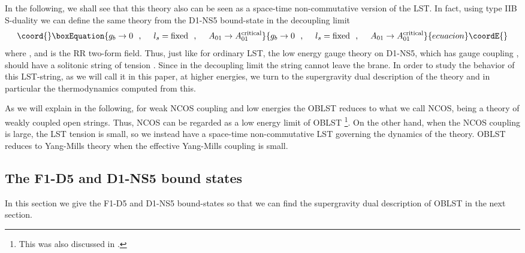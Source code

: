 \documentclass[a4paper,twoside,titlepage,12pt]{article}
\begin{document}
In the following, we shall see that this theory also can be seen as a
space-time non-commutative version of the \coordHE{} LST.
In fact, using type IIB S-duality we can define the same theory from 
the D1-NS5 bound-state in the decoupling limit 
%
\begin{equation}\coord{}\boxEquation{
\gsnb \rightarrow 0 \spa 
\lsn = \mbox{fixed} \spa
A_{01} \rightarrow A_{01}^{\rm critical}
}{
\gsnb \rightarrow 0 \spa 
\lsn = \mbox{fixed} \spa
A_{01} \rightarrow A_{01}^{\rm critical}
}{ecuacion}\coordE{}\end{equation}
%
where \coordHE{}, \coordHE{} 
and \coordHE{} is the RR two-form field.
Thus, just like for ordinary \coordHE{} LST, the low energy gauge theory
on D1-NS5, which has gauge coupling \coordHE{}, should have 
a solitonic string of tension \coordHE{}. 
Since \coordHE{} in the decoupling limit the string cannot leave the
brane.
In order to study the behavior 
of this LST-string, as we will call it in this paper,
at higher energies, we turn to the supergravity dual description of the
theory and in particular the thermodynamics computed from this. 

As we will explain in the following, 
for weak NCOS coupling and low energies the 
\coordHE{} OBLST reduces to what we call
\coordHE{} NCOS, being a theory of weakly coupled open strings.
Thus, \coordHE{} NCOS can be regarded as a low energy limit of \coordHE{} OBLST%
\footnote{This was also discussed in \cite{Harmark:2000wv}.}.
On the other hand, when the NCOS coupling is large, the LST tension
is small, so we instead have a space-time non-commutative 
LST governing the dynamics of the theory.
\coordHE{} OBLST reduces to Yang-Mills theory when the effective Yang-Mills
coupling is small.

\subsection{The F1-D5 and D1-NS5 bound states}

In this section we give the F1-D5 and D1-NS5 bound-states 
so that we can find the supergravity dual description 
of \coordHE{} OBLST in the next section.
\end{document}
